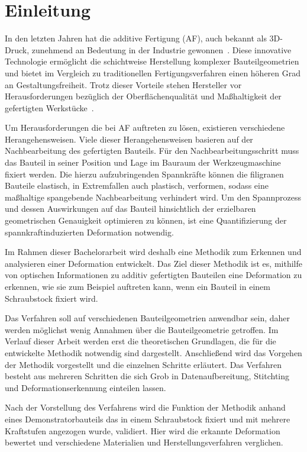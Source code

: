 \chapter{Einleitung}

In den letzten Jahren hat die additive Fertigung (AF), auch bekannt als 3D-Druck, 
zunehmend an Bedeutung in der Industrie gewonnen~\cite{JADHAV20222094}. 
Diese innovative Technologie 
ermöglicht die schichtweise Herstellung komplexer Bauteilgeometrien und bietet im 
Vergleich zu traditionellen Fertigungsverfahren einen höheren Grad an 
Gestaltungsfreiheit. Trotz dieser Vorteile stehen Hersteller vor 
Herausforderungen bezüglich der Oberflächenqualität und Maßhaltigkeit 
der gefertigten Werkstücke~\cite{SCHNECK201919}.

Um Herausforderungen die bei AF auftreten zu lösen, existieren 
verschiedene Herangehensweisen. Viele dieser Herangehensweisen basieren 
auf der Nachbearbeitung des gefertigten Bauteils.
Für den Nachbearbeitungsschritt muss das Bauteil in seiner Position und Lage im Bauraum
der Werkzeugmaschine fixiert werden. Die hierzu aufzubringenden Spannkräfte 
können die filigranen Bauteile elastisch, in Extremfallen auch plastisch, verformen, 
sodass eine maßhaltige spangebende Nachbearbeitung verhindert wird. 
Um den Spannprozess und dessen Auswirkungen auf das Bauteil hinsichtlich 
der erzielbaren geometrischen Genauigkeit optimieren zu
können, ist eine Quantifizierung der spannkraftinduzierten Deformation notwendig.~\cite{newMethod}

Im Rahmen dieser Bachelorarbeit wird deshalb eine Methodik zum Erkennen und 
analysieren einer Deformation entwickelt. Das Ziel dieser Methodik ist es, 
mithilfe von optischen Informationen zu additiv gefertigten Bauteilen eine 
Deformation zu erkennen, wie sie zum Beispiel auftreten kann, wenn ein Bauteil 
in einem Schraubstock fixiert wird.

Das Verfahren soll auf verschiedenen Bauteilgeometrien anwendbar sein, daher werden 
möglichst wenig Annahmen über die Bauteilgeometrie getroffen.
Im Verlauf dieser Arbeit werden erst die theoretischen Grundlagen, die für die 
entwickelte Methodik notwendig sind dargestellt. 
Anschließend wird das Vorgehen der Methodik vorgestellt und die einzelnen 
Schritte erläutert. Das Verfahren besteht aus mehreren Schritten die sich Grob in 
Datenaufbereitung, Stitchting und Deformationserkennung einteilen lassen.

Nach der Vorstellung des Verfahrens wird die Funktion der Methodik anhand eines 
Demonstratorbauteils das in einem Schraubstock fixiert und mit mehrere Kraftstufen 
angezogen wurde, validiert. Hier wird die erkannte Deformation bewertet und 
verschiedene Materialien und Herstellungsverfahren verglichen.


